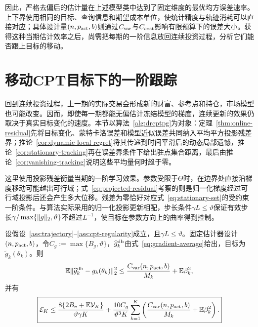 因此，严格去偏后的估计量在上述模型类中达到了固定维度的最优均方误差速率。上下界使用相同的目标、查询信息和期望成本单位，使统计精度与轨迹消耗可以直接对应；具体设计量$(n,p_{\rm act},b)$则通过$C_{\rm var}$与$C_{\rm cost}$影响有限预算下的误差大小。获得这种当期估计效率之后，尚需把每期的一阶信息放回连续投资过程，分析它们能否跟上目标的移动。

\section{移动CPT目标下的一阶跟踪}

回到连续投资过程，上一期的实际交易会形成新的财富、参考点和持仓，市场模型也可能改变。因而，即使每一期都能无偏估计冻结模型的梯度，连续更新的效果仍取决于真实目标变化的速度。本节以算法~\ref{alg:drcptpg}为对象：定理~\ref{thm:online-residual}先将目标变化、蒙特卡洛误差和模型近似误差共同纳入平均平方投影残差界；推论~\ref{cor:dynamic-local-regret}将其传递到时间平滑后的动态局部遗憾，推论~\ref{cor:stationary-tracking}再在误差界条件下给出驻点集合距离，最后由推论~\ref{cor:vanishing-tracking}说明这些平均量何时趋于零。

这里使用投影残差衡量当期的一阶学习效果。参数受限于$\Theta$时，在边界处直接沿梯度移动可能越出可行域；式~\eqref{eq:projected-residual}考察的则是归一化梯度经过可行域投影后还会产生多大位移。残差为零恰好对应式~\eqref{eq:stationary-set}的受约束一阶条件。与算法实际采用的归一化投影更新相配，步长条件$\gamma L\le\vartheta$保证有效步长$\gamma/\max\{\lVert g\rVert_2,\vartheta\}$不超过$L^{-1}$，使目标在参数方向上的曲率得到控制。

\begin{theorem}[期望平均平方投影残差上界]\label{thm:online-residual}
设假设~\ref{ass:trajectory}--\ref{ass:cpt-regularity}成立，且$\gamma L\le\vartheta$。固定估计器设计$(n,p_{\rm act},b)$，令$C_g:=\max\{B_g,\vartheta\}$，$\widehat g_k^{\mathrm{db}}$由式~\eqref{eq:gradient-average}给出，目标为$\widetilde g_k(\theta_k)$。则
\begin{equation}\label{eq:true-gradient-mse}
 \mathbb E\lVert\widehat g_k^{\mathrm{db}}-g_k(\theta_k)\rVert_2^2
 \le\frac{C_{\rm var}(n,p_{\rm act},b)}{M_k}+\mathbb E\beta_k^2,
\end{equation}
并有
\begin{equation}\label{eq:online-residual-bound}
 \boxed{
 \mathcal E_K
 \le
 \frac{8\{2B_v+\mathbb E\mathcal V_K\}}{\vartheta\gamma K}
 +\frac{10C_g}{\vartheta^3K}
 \sum_{k=1}^{K}
 \left(\frac{C_{\rm var}(n,p_{\rm act},b)}{M_k}+\mathbb E\beta_k^2\right).
 }
\end{equation}
\end{theorem}


